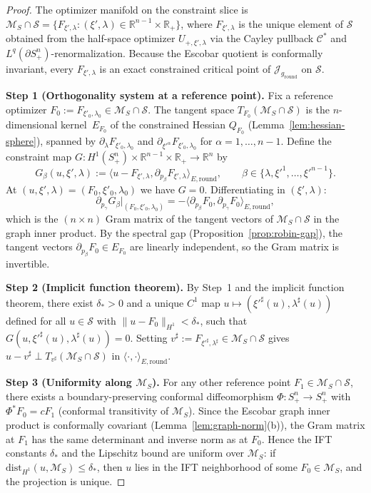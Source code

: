\documentclass[11pt,reqno,a4paper]{amsart}
\newcommand{\R}{\mathbb{R}}
\numberwithin{equation}{section}
\theoremstyle{plain}
\theoremstyle{remark}
\theoremstyle{plain}
\begin{document}
\begin{proof}
The optimizer manifold on the constraint slice is
$\mathcal M_S\cap\mathcal S
=\{F_{\xi',\lambda}:(\xi',\lambda)\in\R^{n-1}\times\R_+\}$,
where $F_{\xi',\lambda}$ is the unique element of
$\mathcal S$ obtained from the half-space optimizer
$U_{+,\xi',\lambda}$ via the Cayley pullback
$\mathcal C^\ast$ and $L^q(\partial S^n_+)$-renormalization.
Because the Escobar quotient is conformally invariant,
every $F_{\xi',\lambda}$ is an exact constrained critical point of
$\mathcal J_{g_{\mathrm{round}}}$ on $\mathcal S$.

\smallskip
\noindent\textbf{Step 1 (Orthogonality system at a reference point).}
Fix a reference optimizer $F_0:=F_{\xi'_0,\lambda_0}\in\mathcal M_S\cap\mathcal S$.
The tangent space $T_{F_0}(\mathcal M_S\cap\mathcal S)$ is the
$n$-dimensional kernel~$E_{F_0}$ of the constrained Hessian
$Q_{F_0}$ (Lemma~\ref{lem:hessian-sphere}), spanned by
$\partial_\lambda F_{\xi'_0,\lambda_0}$ and
$\partial_{\xi'^\alpha}F_{\xi'_0,\lambda_0}$ for
$\alpha=1,\dots,n-1$.
Define the constraint map
$G:H^1(S^n_+)\times\R^{n-1}\times\R_+\to\R^{n}$ by
\[
G_\beta(u,\xi',\lambda)
:=\big\langle u-F_{\xi',\lambda},
\partial_{p_\beta}F_{\xi',\lambda}\big\rangle_{E,\mathrm{round}},
\qquad \beta\in\{\lambda,\xi'^1,\dots,\xi'^{n-1}\}.
\]
At $(u,\xi',\lambda)=(F_0,\xi'_0,\lambda_0)$ we have $G=0$.
Differentiating in $(\xi',\lambda)$:
\[
\partial_{p_\gamma}G_\beta\big|_{(F_0,\xi'_0,\lambda_0)}
=-\big\langle \partial_{p_\beta}F_0,
\partial_{p_\gamma}F_0\big\rangle_{E,\mathrm{round}},
\]
which is the $(n\times n)$ Gram matrix of the tangent vectors
of $\mathcal M_S\cap\mathcal S$ in the graph inner product.
By the spectral gap (Proposition~\ref{prop:robin-gap}),
the tangent vectors $\partial_{p_\beta}F_0\in E_{F_0}$
are linearly independent, so the Gram matrix is invertible.

\smallskip
\noindent\textbf{Step 2 (Implicit function theorem).}
By Step~1 and the implicit function theorem,
there exist $\delta_\ast>0$ and a unique $C^1$ map
$u\longmapsto(\xi'^\sharp(u),\lambda^\sharp(u))$
defined for all $u\in\mathcal S$ with
$\|u-F_0\|_{H^1}<\delta_\ast$,
such that
$G(u,\xi'^\sharp(u),\lambda^\sharp(u))=0$.
Setting $v^\sharp:=F_{\xi'^\sharp,\lambda^\sharp}
\in\mathcal M_S\cap\mathcal S$
gives
$u-v^\sharp\perp T_{v^\sharp}(\mathcal M_S\cap\mathcal S)$
in $\langle\cdot,\cdot\rangle_{E,\mathrm{round}}$.

\smallskip
\noindent\textbf{Step 3 (Uniformity along $\mathcal M_S$).}
For any other reference point $F_1\in\mathcal M_S\cap\mathcal S$,
there exists a boundary-preserving conformal diffeomorphism
$\Phi:S^n_+\to S^n_+$ with $\Phi^\ast F_0=cF_1$
(conformal transitivity of $\mathcal M_S$).
Since the Escobar graph inner product is conformally
covariant (Lemma~\ref{lem:graph-norm}(b)),
the Gram matrix at $F_1$ has the same determinant and inverse
norm as at $F_0$.
Hence the IFT constants $\delta_\ast$ and the Lipschitz
bound are uniform over $\mathcal M_S$:
if $\mathrm{dist}_{H^1}(u,\mathcal M_S)\le\delta_\ast$, then
$u$ lies in the IFT neighborhood of some $F_0\in\mathcal M_S$,
and the projection is unique.


\end{proof}
\end{document}
